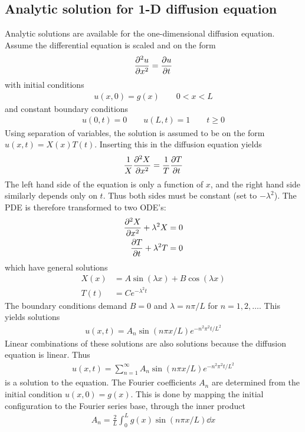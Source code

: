 \documentclass[aps,reprint]{revtex4-1}
\begin{document}
\subsection{Analytic solution for 1-D diffusion equation}
Analytic solutions are available for the one-dimensional diffusion equation. Assume
the differential equation is scaled and on the form
\begin{align*}
  \pdv[2]{u}{x} = \pdv{u}{t}
\end{align*}
with initial conditions
\begin{align*}
  u(x,0) = g(x) \qquad 0 < x < L
\end{align*}
and constant boundary conditions
\begin{align*}
  u(0,t) = 0 \qquad u(L,t) = 1 \qquad t \geq 0
\end{align*}
Using separation of variables, the solution is assumed to be on the form
$u(x,t) = X(x)T(t)$. Inserting this in the diffusion equation yields
\begin{align*}
  \frac{1}{X} \pdv[2]{X}{x} = \frac{1}{T} \pdv{T}{t}
\end{align*}
The left hand side of the equation is only a function of $x$, and the right hand
side similarly depends only on $t$. Thus both sides must be constant (set to $-\lambda^2$).
The PDE is therefore transformed to two ODE's:
\begin{align*}
  \pdv[2]{X}{x} + \lambda^2 X &= 0 \\
  \pdv{T}{t}    + \lambda^2 T &= 0
\end{align*}
which have general solutions
\begin{align*}
  X(x) &= A\sin{(\lambda x)} + B\cos{(\lambda x)} \\
  T(t) &= Ce^{-\lambda^2 t}
\end{align*}
The boundary conditions demand $B = 0$ and $\lambda = n \pi /L$ for $n = 1,2,\hdots$.
This yields solutions
\begin{align*}
  u(x,t) = A_n \sin{(n\pi x/L)}e^{-n^2 \pi^2 t/ L^2}
\end{align*}
Linear combinations of these solutions are also solutions because the diffusion
equation is linear. Thus
\begin{align}
  u(x,t) = \sum_{n = 1}^{\infty} A_n \sin{(n\pi x/L)}e^{-n^2 \pi^2 t/ L^2}
\end{align}
is a solution to the equation. The Fourier coefficients $A_n$ are determined
from the initial condition $u(x,0) = g(x)$. This is done by mapping the initial
configuration to the Fourier series base, through the inner product
\begin{align*}
  A_n = \frac{2}{L}\int_0^L g(x) \sin{(n \pi x / L)} \dd{x}
\end{align*}
\end{document}
